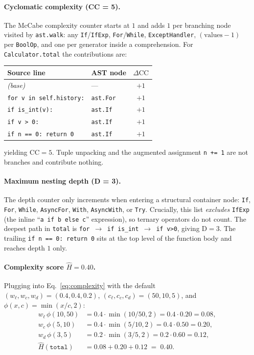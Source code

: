 \paragraph{Cyclomatic complexity (\textnormal{CC} = 5).}
The McCabe complexity counter starts at $1$ and adds $1$ per branching
node visited by \texttt{ast.walk}: any \texttt{If}/\texttt{IfExp},
\texttt{For}/\texttt{While}, \texttt{ExceptHandler},
$(\text{values}{-}1)$ per \texttt{BoolOp}, and one per generator inside
a comprehension.
For \texttt{Calculator.total} the contributions are:
%
\begin{center}\small
\begin{tabular}{l l c}
\toprule
Source line & AST node & $\Delta\mathrm{CC}$ \\
\midrule
\textit{(base)}                       & ---                 & $+1$ \\
\texttt{for v in self.history:}       & \texttt{ast.For}    & $+1$ \\
\texttt{if is\_int(v):}               & \texttt{ast.If}     & $+1$ \\
\texttt{if v > 0:}                    & \texttt{ast.If}     & $+1$ \\
\texttt{if n == 0: return 0}          & \texttt{ast.If}     & $+1$ \\
\bottomrule
\end{tabular}
\end{center}
%
yielding $\mathrm{CC}=5$. Tuple unpacking and the augmented assignment
\texttt{n += 1} are not branches and contribute nothing.

\paragraph{Maximum nesting depth (\textnormal{D} = 3).}
The depth counter only increments when entering a structural container
node: \texttt{If}, \texttt{For}, \texttt{While}, \texttt{AsyncFor},
\texttt{With}, \texttt{AsyncWith}, or \texttt{Try}. Crucially, this
list \emph{excludes} \texttt{IfExp} (the inline ``\texttt{a if b else
c}'' expression), so ternary operators do not count. The deepest path
in \texttt{total} is
\texttt{for}~$\to$~\texttt{if is\_int}~$\to$~\texttt{if v>0}, giving
$\mathrm{D}=3$. The trailing \texttt{if n == 0: return 0} sits at the
top level of the function body and reaches depth $1$ only.

\paragraph{Complexity score $\hat{H}=0.40$.}
Plugging into Eq.~\ref{eq:complexity} with the default
$(w_{\ell},w_{c},w_{d})=(0.4,0.4,0.2)$,
$(c_{\ell},c_{c},c_{d})=(50,10,5)$, and $\phi(x,c)=\min(x/c,2)$:
%
\begin{align*}
w_{\ell}\,\phi(10,50)
   &= 0.4\!\cdot\!\min(10/50,2) = 0.4\!\cdot\!0.20 = 0.08, \\
w_{c}\,\phi(5,10)
   &= 0.4\!\cdot\!\min(5/10,2)  = 0.4\!\cdot\!0.50 = 0.20, \\
w_{d}\,\phi(3,5)
   &= 0.2\!\cdot\!\min(3/5,2)   = 0.2\!\cdot\!0.60 = 0.12, \\
\hat{H}(\texttt{total})
   &= 0.08+0.20+0.12 \;=\; 0.40.
\end{align*}

